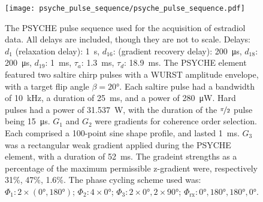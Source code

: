 \begin{figure}[H]
    \texttt{[image: psyche\_pulse\_sequence/psyche\_pulse\_sequence.pdf]}
    \caption[
        The \acs{PSYCHE} pulse sequence used for the acquisition of estradiol
        data.
    ]{
        The \acs{PSYCHE} pulse sequence used for the acquisition of estradiol
        data. All
        delays are included, though they are not to scale.
        Delays:
        $d_1$ (relaxation delay): \qty{1}{\second},
        $d_{16}$: (gradient recovery delay): \qty{200}{\micro\second},
        $d_{18}$: \qty{200}{\micro\second},
        $d_{19}$: \qty{1}{\milli\second},
        $\tau_a$: \qty{1.3}{\milli\second},
        $\tau_d$: \qty{18.9}{\milli\second}.
        The \ac{PSYCHE} element featured two saltire chirp pulses with a
        \ac{WURST}\cite{ODell2013}
        amplitude envelope, with a target flip angle $\beta = \ang{20}$.
        Each saltire pulse
        had a bandwidth of \qty{10}{\kilo\hertz},
        a duration of \qty{25}{\milli\second},
        and a power of \qty{280}{\micro\watt}.
        Hard pulses
        had a power of \qty{31.537}{\watt},
        with the duration of the $\nicefrac{\pi}{2}$ pulse being \qty{15}{\micro\second}.
        $G_1$ and $G_2$ were gradients for coherence order selection.
        Each comprised a 100-point sine shape profile, and lasted
        \qty{1}{\milli\second}.
        $G_3$ was a rectangular weak gradient applied during the PSYCHE
        element, with a duration of \qty{52}{\milli\second}.
        The gradeint strengths as a percentage of the maximum permissible
        z-gradient were, respectively 31\%, 47\%, 1.6\%.
        The phase cycling scheme used was:
        $\Phi_1: 2 \times (\ang{0}, \ang{180})$;
        $\Phi_2: 4 \times \ang{0}$;
        $\Phi_3: 2 \times \ang{0}, 2 \times \ang{90}$;
        $\Phi_{\text{rx}}: \ang{0}, \ang{180}, \ang{180}, \ang{0}$.
    }
    \label{fig:psyche}

\end{figure}
\clearpage

